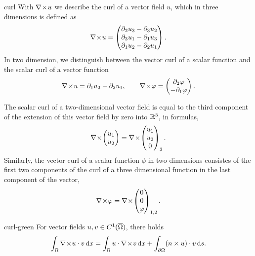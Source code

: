 \begin{Notation}{curl}
  With $\nabla\!\times\! u$ we describe the curl of a vector field $u$, which in
  three dimensions is defined as
  \begin{gather}
    \label{eq:maxwell:2}
    \nabla\!\times\! u =
    \begin{pmatrix}
      \partial_2u_3-\partial_3u_2\\\partial_3u_1-\partial_1u_3\\\partial_1u_2-\partial_2u_1
    \end{pmatrix}.
  \end{gather}
  In two dimension, we distinguish between the vector curl of a scalar
  function and the scalar curl of a vector function
  \begin{gather}
    \nabla\!\times\! u = \partial_1u_2-\partial_2u_1,
    \qquad
    \nabla\!\times\! \varphi =
    \begin{pmatrix}
      \partial_2 \varphi \\ -\partial_1\varphi
    \end{pmatrix}.
  \end{gather}
\end{Notation}

\begin{remark}
  The scalar curl of a two-dimensional vector field is equal to the
  third component of the extension of this vector field by zero into
  $\mathbb R^3$, in formulas,
  \begin{gather}
    \nabla\!\times\!
    \begin{pmatrix}
      u_1\\u_2
    \end{pmatrix}
    =
    \nabla\!\times\!
    \begin{pmatrix}
      u_1\\u_2\\0
    \end{pmatrix}_3.
  \end{gather}
  Similarly, the vector curl of a scalar function $\phi$ in two dimensions
  consistes of the first two components of the curl of a three
  dimensional function in the last component of the vector,
  \begin{gather}
    \nabla\!\times\! \varphi = \nabla\!\times\!
    \begin{pmatrix}
      0\\0\\\varphi
    \end{pmatrix}_{1,2}.
  \end{gather}
\end{remark}

\begin{Lemma}{curl-green}
  For vector fields $u,v\in C^1(\overline{\Omega})$, there holds
  \begin{gather}
    \label{eq:maxwell:3}
    \int_{\Omega} \nabla\!\times\! u\cdot v\,\mathrm{d} x = \int_{\Omega} u\cdot\nabla\!\times\! v\,\mathrm{d} x
    + \int_{\partial\Omega} (n\times u) \cdot v \,\mathrm{d} s.
  \end{gather}
\end{Lemma}

